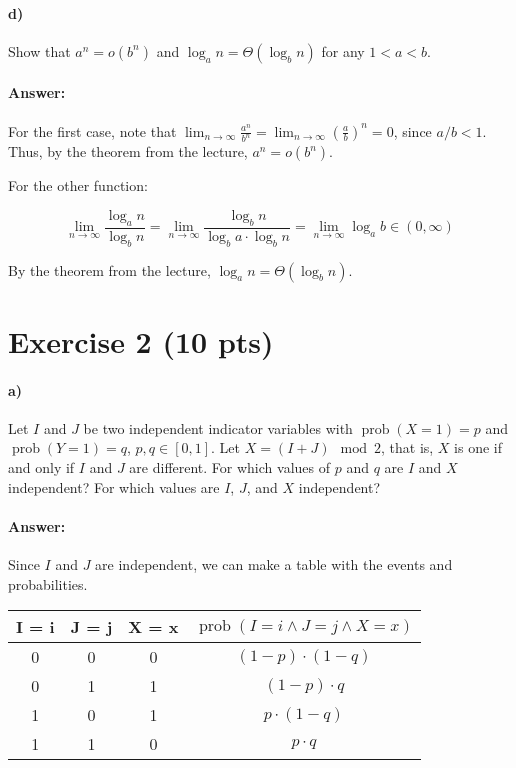\documentclass[a4paper]{article}
\begin{document}
\paragraph{d)} Show that $a^n = o(b^n)$ and $\log_a n = \Theta (\log_b n)$ for any $1 < a < b$.

\paragraph{Answer:}

For the first case, note that $\lim_{n \rightarrow \infty}\frac{a^n}{b^n} = \lim_{n \rightarrow \infty}\left (\frac{a}{b} \right )^n = 0$, since $a/b < 1$. Thus, by the theorem from the lecture, $a^n = o(b^n)$.

For the other function:

$$\lim_{n \rightarrow \infty}\frac{\log_a n}{\log_b n} = \lim_{n \rightarrow \infty}\frac{\log_b n}{\log_b a \cdot \log_b n} = \lim_{n \rightarrow \infty} \log_a b \in (0,\infty)$$

By the theorem from the lecture, $\log_a n = \Theta(\log_b n)$.

\section{Exercise 2 (10 pts)}
\newcommand{\prob}{\operatorname{prob}}%

\paragraph{a)} Let $I$ and $J$ be two independent indicator variables with $\prob(X = 1) = p$ and $\prob(Y = 1) = q$, $p, q \in [0,1]$. Let $X = ( I + J) \mod 2$, that is, $X$ is one if and only if $I$ and $J$ are different. For which values of $p$ and $q$ are $I$ and $X$ independent? For which values are $I$, $J$, and $X$ independent?

\paragraph{Answer:}

Since $I$ and $J$ are independent, we can make a table with the events and probabilities.

\begin{center}
\begin{tabular}{ c | c | c | c }
  I = i & J = j & X = x & $\prob(I = i \wedge J = j \wedge X = x)$\\
  \hline                       
  0 & 0 & 0 & $(1-p)\cdot (1-q)$\\
  0 & 1 & 1 & $(1-p)\cdot q$\\
  1 & 0 & 1 & $p\cdot (1-q)$\\
  1 & 1 & 0 & $p \cdot q$\\
  \hline  
\end{tabular}
\end{center}
\end{document}

